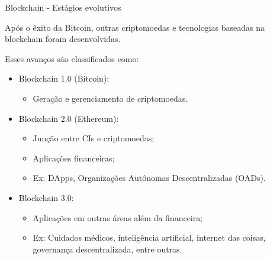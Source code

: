 \begin{frame}{Blockchain - Estágios evolutivos}
    \begin{block}{}
    Após o êxito da Bitcoin, outras criptomoedas e tecnologias baseadas na blockchain foram desenvolvidas.
    \end{block}
    Esses avanços são classificados como:
    \begin{itemize}
        \item Blockchain 1.0 (Bitcoin):
        \begin{itemize}
            \item Geração e gerenciamento de criptomoedas.
        \end{itemize}
        \item Blockchain 2.0 (Ethereum):
        \begin{itemize}
            \item Junção entre CIs e criptomoedas;
            \item Aplicações financeiras;
            \item Ex: DApps, Organizações Autônomas Descentralizadas (OADs).
        \end{itemize}
        \item Blockchain 3.0:
        \begin{itemize}
            \item Aplicações em outras áreas além da financeira;
            \item Ex: Cuidados médicos, inteligência artificial, internet das coisas, governança descentralizada, entre outras.
        \end{itemize}
    \end{itemize}
\end{frame}


